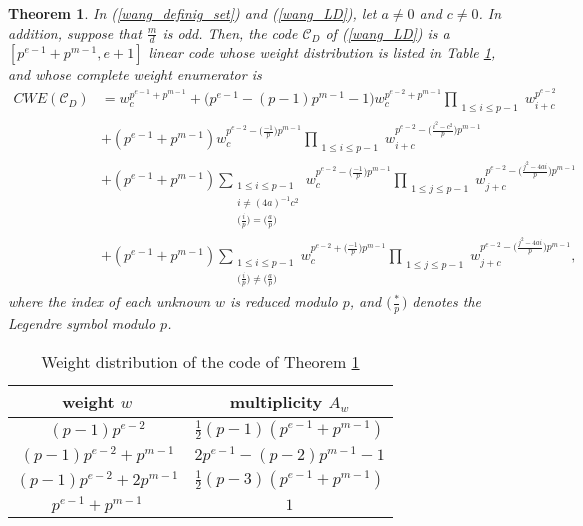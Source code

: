 \documentclass[final,1p,times]{elsarticle}
\newtheorem{sec2_thm2}[sec2_thm1]{Theorem}
\begin{document}
    \begin{sec2_thm2}\label{s2_thm2}
    In (\ref{wang_definig_set}) and (\ref{wang_LD}), let $ a\ne 0 $ and $ c\ne 0 $. In addition, suppose that $ \frac{m}{d} $ is odd. Then, the code $ \mathcal{C}_{D} $ of (\ref{wang_LD}) is a $ [p^{e-1}+p^{m-1},e+1] $ linear code whose weight distribution is listed in Table \ref{tab_s2_thm2},  and whose complete weight enumerator is 
     \begin{equation}\label{cwe_ac_mdodd}
     \begin{split}
     \mathit{CWE}(\mathcal{C}_{D})&=w_{c}^{p^{e-1}+p^{m-1}}+
     \bigl(p^{e-1}-(p-1)p^{m-1}-1\bigr)w_{c}^{p^{e-2}+p^{m-1}}\prod_{\substack{1\leq i\leq p-1}}w_{i+c}^{p^{e-2}}\\
     &+(p^{e-1}+p^{m-1})w_{c}^{p^{e-2}-\bigl(\frac{-1}{p}\bigr)p^{m-1}}\prod_{\substack{1\leq i\leq p-1}}w_{i+c}^{p^{e-2}-\bigl(\frac{i^{2}-c^{2}}{p}\bigr)p^{m-1}}\\
     &+(p^{e-1}+p^{m-1})\sum_{\substack{1\leq i\leq p-1\\i\ne (4a)^{-1}c^{2}\\\bigl(\frac{i}{p}\bigr)=\bigl(\frac{a}{p}\bigr)}}w_{c}^{p^{e-2}-\bigl(\frac{-1}{p}\bigr)p^{m-1}}
       \prod_{\substack{1\leq j\leq p-1}}w_{j+c}^{p^{e-2}-\bigl(\frac{j^{2}-4ai}{p}\bigr)p^{m-1}}\\
       &+(p^{e-1}+p^{m-1})\sum_{\substack{1\leq i\leq p-1\\\bigl(\frac{i}{p}\bigr)\ne \bigl(\frac{a}{p}\bigr)}} w_{c}^{p^{e-2}+\bigl(\frac{-1}{p}\bigr)p^{m-1}}
        \prod_{\substack{1\leq j\leq p-1}}w_{j+c}^{p^{e-2}-\bigl(\frac{j^{2}-4ai}{p}\bigr)p^{m-1}},
     \end{split}
     \end{equation}
     where the index of each unknown $ w $ is reduced modulo $ p $, and $ \bigl(\frac{*}{p}\bigr) $ denotes the Legendre symbol modulo $ p $.
    \end{sec2_thm2}
    \begin{table}[tbh]
       \caption{Weight distribution of the code of  Theorem \ref{s2_thm2}}
       \label{tab_s2_thm2}
       \begin{center}
       \begin{tabular}{|c|c|}
       \hline
       weight $ w $ & multiplicity $ A_{w} $ \\
        \hline
       $ (p-1)p^{e-2} $ & $ \frac{1}{2}(p-1)(p^{e-1}+p^{m-1}) $\\
       \hline
       $ (p-1)p^{e-2}+p^{m-1} $ & $ 2p^{e-1}-(p-2)p^{m-1}-1 $\\
       \hline
       $ (p-1)p^{e-2}+2p^{m-1} $ & $ \frac{1}{2}(p-3)(p^{e-1}+p^{m-1}) $\\
       \hline
       $ p^{e-1}+p^{m-1} $ & $ 1 $\\
        \hline
       \end{tabular}
       \end{center}
       \end{table}
\end{document}
